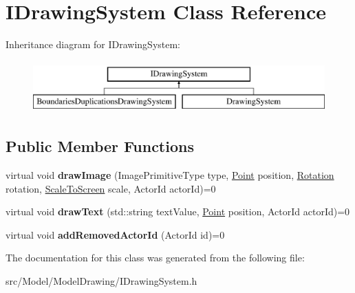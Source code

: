 \hypertarget{classIDrawingSystem}{}\section{I\+Drawing\+System Class Reference}
\label{classIDrawingSystem}
Inheritance diagram for I\+Drawing\+System\+:\begin{figure}[H]
\begin{center}
\leavevmode
\includegraphics[height=2.000000cm]{classIDrawingSystem}
\end{center}
\end{figure}
\subsection*{Public Member Functions}
\begin{DoxyCompactItemize}
\item 
virtual void {\bfseries draw\+Image} (Image\+Primitive\+Type type, \hyperlink{classPoint}{Point} position, \hyperlink{classRotation}{Rotation} rotation, \hyperlink{classScaleToScreen}{Scale\+To\+Screen} scale, Actor\+Id actor\+Id)=0\hypertarget{classIDrawingSystem_ae4016831473bbdbc878adfd6f6907671}{}\label{classIDrawingSystem_ae4016831473bbdbc878adfd6f6907671}

\item 
virtual void {\bfseries draw\+Text} (std\+::string text\+Value, \hyperlink{classPoint}{Point} position, Actor\+Id actor\+Id)=0\hypertarget{classIDrawingSystem_a1729c24b624d76ac677e0b216215edb6}{}\label{classIDrawingSystem_a1729c24b624d76ac677e0b216215edb6}

\item 
virtual void {\bfseries add\+Removed\+Actor\+Id} (Actor\+Id id)=0\hypertarget{classIDrawingSystem_a179d95332581cf97996c8221e8813f1c}{}\label{classIDrawingSystem_a179d95332581cf97996c8221e8813f1c}

\end{DoxyCompactItemize}


The documentation for this class was generated from the following file\+:\begin{DoxyCompactItemize}
\item 
src/\+Model/\+Model\+Drawing/I\+Drawing\+System.\+h\end{DoxyCompactItemize}
